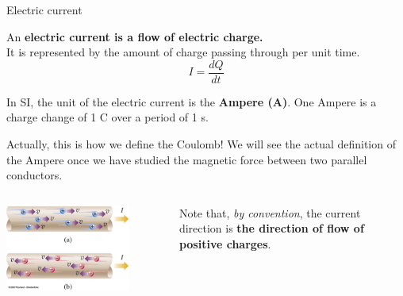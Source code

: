 
%
%
%

\begin{frame}{Electric current}

An {\bf electric current is a flow of electric charge.}\\
\vspace{0.2cm}
It is represented by the amount of charge passing through per unit time.
\begin{equation*}
  I = \frac{dQ}{dt}
\end{equation*}

In SI, the unit of the electric current is the {\bf Ampere (A)}.
One Ampere is a charge change of 1 C over a period of 1 s.
\begin{itemize}
{\scriptsize
   \item Actually, this is how we define the Coulomb!
             We will see the actual definition of the Ampere once we have studied the magnetic force
              between two parallel conductors.\\
}
\end{itemize}

\vspace{0.1cm}

\begin{columns}
  \begin{column}{0.45\textwidth}
   \begin{center}
    \includegraphics[width=0.78\textwidth]{./images/schematics/current_direction_convention.png}
   \end{center}
  \end{column}
  \begin{column}{0.55\textwidth}
     Note that, {\em by convention}, the current direction is {\bf the direction of flow of positive charges}.
  \end{column}
\end{columns}

\end{frame}

